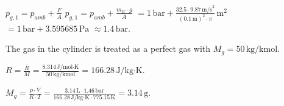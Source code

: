 \( p_{g,1} = p_{amb} + \frac{F}{A} \)  
\( p_{g,1} = p_{amb} + \frac{m_K \cdot g}{A} \)  
\( = 1 \, \text{bar} + \frac{32.5 \cdot 9.87 \, \text{m/s}^2}{\left(0.1 \, \text{m}\right)^2 \cdot \pi} \, \text{m}^2 \)  
\( = 1 \, \text{bar} + 3.595685 \, \text{Pa} \)  
\( \approx 1.4 \, \text{bar} \).  

The gas in the cylinder is treated as a perfect gas with \( M_g = 50 \, \text{kg/kmol} \).  

\( R = \frac{\overline{R}}{M} = \frac{8.314 \, \text{J/mol·K}}{50 \, \text{kg/kmol}} = 166.28 \, \text{J/kg·K} \).  

\( M_g = \frac{p \cdot V}{R \cdot T} = \frac{3.14 \, \text{L} \cdot 1.46 \, \text{bar}}{166.28 \, \text{J/kg·K} \cdot 775.15 \, \text{K}} = 3.14 \, \text{g} \).